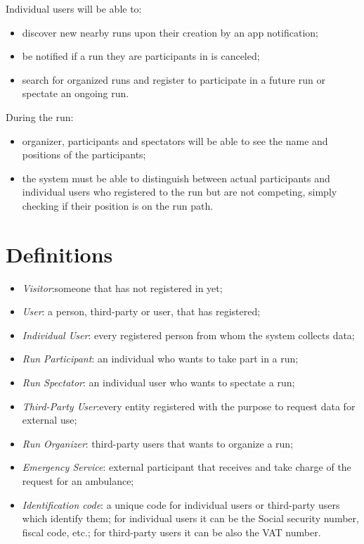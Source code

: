 Individual users will be able to: 
\begin{itemize}
\item 
discover new nearby runs upon their creation by an app notification; 
\item 
be notified if a run they are participants in is canceled; 
\item 
search for organized runs and register to participate in a future run or spectate an ongoing run.
\end{itemize}
During the run: 
\begin{itemize}
\item 
organizer, participants and spectators will be able to see the name and positions of the participants; 
\item 
the system must be able to distinguish between actual participants and individual users who registered to the run but are not competing, simply checking if their position is on the run path. 
\end{itemize}

\section{Definitions}
\begin{itemize}
\item \textit{Visitor}:someone that has not registered in yet;
\item \textit{User}: a person, third-party or user, that has registered;
\item \textit{Individual User}: every registered person from whom the system collects data; 
\item \textit{Run Participant}: an individual who wants to take part in a run;
\item \textit{Run Spectator}: an individual user who wants to spectate a run;
\item \textit{Third-Party User}:every entity registered with the purpose to request data for external use;
\item \textit{Run Organizer}: third-party users that wants to organize a run;
\item \textit{Emergency Service}: external participant that receives and take charge of the request for an ambulance;
\item \textit{Identification code}: a unique code for individual users or third-party users which identify them; for individual users it can be the Social security number, fiscal code, etc.; for third-party users it can be also the VAT number.
\end{itemize}
